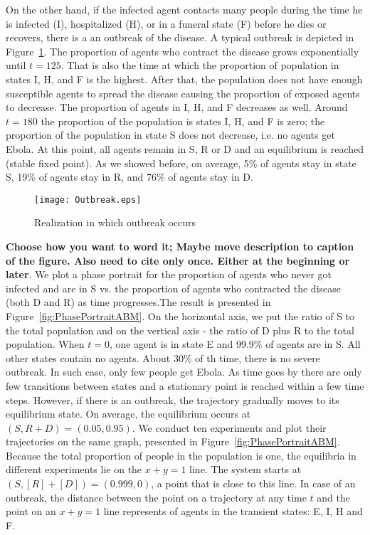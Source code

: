 On the other hand, if the infected agent contacts many people during the time he is infected (I), hospitalized (H), or in a funeral state (F) before he dies or recovers, there is a an outbreak of the disease. A typical outbreak is depicted in Figure~\ref{fig:Outbreak}. The proportion of agents who contract the disease grows exponentially until $t = 125$. That is also the time at which the proportion of population  in states I, H, and F is the highest. After that, the population does not have enough susceptible agents to spread the disease causing the proportion of exposed agents to decrease. The proportion of agents in I, H, and F decreases as well. Around $t = 180$ the proportion of the population is states I, H, and F is zero; the proportion of the population in state S does not decrease, i.e. no agents get Ebola. At this point, all agents remain in S, R or D and an equilibrium is reached (stable fixed point). As we showed before, on average, 5\% of agents stay in state S, 19\% of agents stay in R, and 76\% of agents stay in D. 
\begin{figure}
\begin{center}
\texttt{[image: Outbreak.eps]}
\end{center}
\caption{Realization in which outbreak occurs}
\label{fig:Outbreak}
\end{figure}



\textbf{Choose how you want to word it; Maybe move description to caption of the figure. Also need to cite only once. Either at the beginning or later}.
We plot a phase portrait for the proportion of agents who never got infected and are in S vs. the proportion of agents who contracted the disease (both D and R) as time progresses.The result is presented in Figure~\ref{fig:PhasePortraitABM}. On the horizontal axis, we put the ratio of S to the total population and on the vertical axis - the ratio of D plus R to the total population.  When $t = 0$, one agent is in state E and 99.9\% of agents are in S. All other states contain no agents. About 30\% of th time, there is no severe outbreak. In such case, only few people get Ebola. As time goes by there are only few transitions between states and a stationary point is reached within a few time steps. However, if there is an outbreak, the trajectory gradually moves to its equilibrium state. On average, the equilibrium occurs at $(S, R+ D) = (0.05, 0.95)$. We conduct ten experiments and plot their trajectories on the same graph, presented in Figure~\ref{fig:PhasePortraitABM}. Because the total proportion of people in the population is one, the equilibria in different experiments lie on the $x + y = 1$ line. The system starts at $(S, [R]+[D]) = (0.999, 0)$, a point that is close to this line. In case of an outbreak, the distance between the point on a trajectory at any time $t$ and the point on an $x+y=1$ line represents  of agents in the transient states: E, I, H and F. 

